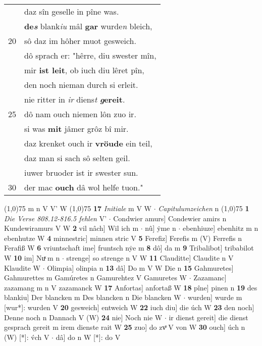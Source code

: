 \documentclass[8pt,a4paper,notitlepage]{article}
\begin{document}
\begin{table}[ht]
\begin{minipage}[t]{0.5\linewidth}
\begin{tabular}{rl}
 & daz sîn geselle in pîne was.\\ 
 & \textbf{de\textit{s}} blank\textit{iu} mâl \textbf{gar} wurde\textit{n} bleich,\\ 
20 & sô daz im hôher muot gesweich.\\ 
 & dô sprach er: "hêrre, diu swester mîn,\\ 
 & mir \textbf{ist leit}, ob iuch diu lêret pîn,\\ 
 & den noch nieman durch si erleit.\\ 
 & nie ritter in \textit{ir} diens\textit{t} \textbf{\textit{g}ereit}.\\ 
25 & dô nam ouch niemen lôn zuo ir.\\ 
 & si was \textbf{mit} jâmer grôz bî mir.\\ 
 & daz krenket ouch ir \textbf{vröude} ein teil,\\ 
 & daz man si sach sô selten geil.\\ 
 & iuwer bruoder ist ir swester sun.\\ 
30 & der mac \textbf{ouch} dâ wol helfe tuon."\\ 
\end{tabular}
\scriptsize
\line(1,0){75} \newline
m n V V' W \newline
\line(1,0){75} \newline
\textbf{17} \textit{Initiale} m V W   $\cdot$ \textit{Capitulumzeichen} n  \newline
\line(1,0){75} \newline
\textbf{1} \textit{Die Verse 808.12-816.5 fehlen} V'   $\cdot$ Condwier amurs] Condewier amirs n Kundewiramurs V W \textbf{2} vil nâch] Wil ich m  $\cdot$ nû] ẏme n  $\cdot$ ebenhiuze] ebenhitz m n ebenhutze W \textbf{4} minnestric] minnen stric V \textbf{5} Ferefiz] Ferefis m (V) Ferrefis n Ferafiß W \textbf{6} vriuntschaft ime] fruntsch nẏe m \textbf{8} dô] da m \textbf{9} Tribalibot] tribabilot W \textbf{10} im] Nuͯ m n  $\cdot$ strenge] so strenge n V W \textbf{11} Clauditte] Claudite n V Klaudite W  $\cdot$ Olimpia] olinpia n \textbf{13} dâ] Do m V W Die n \textbf{15} Gahmuretes] Gahmurettes m Gamúretes n Gamurehtez V Gamuretes W  $\cdot$ Zazamanc] zazamang m n V zazamanck W \textbf{17} Anfortas] anfortaß W \textbf{18} pîne] pinen n \textbf{19} des blankiu] Der blancken m Des blancken n Die blancken W  $\cdot$ wurden] wurde m [wur*]: wurden V \textbf{20} gesweich] entweich W \textbf{22} iuch diu] die úch W \textbf{23} den noch] Denne noch n Dannach V (W) \textbf{24} nie] Noch nie W  $\cdot$ ir dienst gereit] die dienst gesprach gereit m irem dienste rait W \textbf{25} zuo] do zvͦ V von W \textbf{30} ouch] úch n (W) [*]: v́ch  V  $\cdot$ dâ] do n W [*]: do V \newline
\end{minipage}
\end{table}
\end{document}
